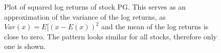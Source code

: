 \begin{figure}[h]
    \centering
    \begin{adjustbox}{width=.95\textwidth,center}
    
    \end{adjustbox}  
    \caption{Plot of squared log returns of stock PG. This serves as an approximation of the variance of the log returns, as $Var(x) = E [(x - E(x))^2$ and the mean of the log returns is close to zero. The pattern looks similar for all stocks, therefore only one is shown.}
    \label{fig:PG_squared_log_returns}
\end{figure}{}



